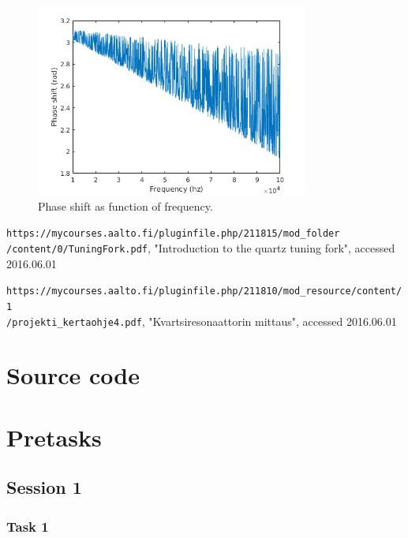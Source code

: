 \documentclass[12pt]{article}
\begin{document}
\begin{figure}[!ht]
\centering
\includegraphics[width = 0.8\textwidth]{kuvat/f-ps.png}
\caption{Phase shift as function of frequency.}
\label{fig:f-ps}
\end{figure}

\begin{thebibliography}{1}
 \texttt{https://mycourses.aalto.fi/pluginfile.php/211815/mod\_folder\\/content/0/TuningFork.pdf}, "Introduction to the quartz tuning fork", accessed 2016.06.01

 \texttt{https://mycourses.aalto.fi/pluginfile.php/211810/mod\_resource/content/1\\/projekti\_kertaohje4.pdf}, "Kvartsiresonaattorin mittaus", accessed 2016.06.01
\end{thebibliography}

\appendix

\section{Source code}


%

\section{Pretasks}

\subsection{Session 1}

\subsubsection{Task 1}
\end{document}
